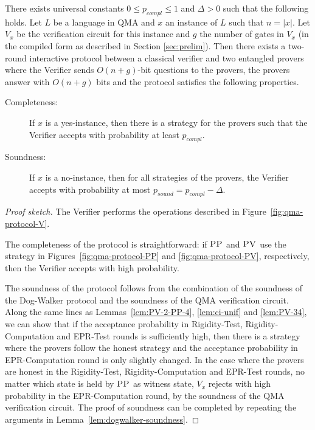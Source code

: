 \begin{lemma}
There
  exists universal constants $0\leq p_{compl}\leq 1$ and $\Delta >0$ such that the following holds. 
Let $L$ be a language in QMA and $x$ an instance of $L$ such that $n = |x|$. Let  $V_x$ be the
  verification circuit for this instance and $g$ the number of gates in $V_x$
  (in the compiled form as described in Section \ref{sec:prelim}). Then there exists a two-round interactive protocol
between a classical verifier and two entangled provers where the Verifier
sends  $O(n + g)$-bit questions to the provers, the provers answer with $O(n + g)$ bits and the protocol satisfies the following properties.
\begin{description}
\item[Completeness:] If $x$ is a yes-instance, then  there is a strategy for the provers such that the Verifier accepts with probability  at least $p_{compl}$.
\item[Soundness:] If $x$ is a no-instance, then for all strategies of the provers, the Verifier accepts with  probability at most
$p_{sound} = p_{compl} - \Delta$.
\end{description}
\end{lemma}
\begin{proof}[Proof sketch]
The Verifier performs the operations described in Figure~\ref{fig:qma-protocol-V}. 

  The completeness of the protocol is straightforward: if $\textsc{PP}$ and $\textsc{PV}$ use the strategy in Figures~\ref{fig:qma-protocol-PP} and \ref{fig:qma-protocol-PV}, respectively, then the Verifier accepts with  high probability.

  The soundness of the protocol follows from the combination of the soundness of the
  Dog-Walker protocol and the soundness of the QMA verification circuit. Along the same lines as 
  Lemmas~\ref{lem:PV-2-PP-4}, \ref{lem:ci-unif} and \ref{lem:PV-34},
  we can show that if
  the acceptance probability in Rigidity-Test, Rigidity-Computation and
  EPR-Test rounds
  is sufficiently high, then there is a strategy where the provers follow the honest
  strategy and the acceptance probability in EPR-Computation round is only slightly
  changed.  
  In the case where the provers are honest in the Rigidity-Test, Rigidity-Computation and EPR-Test rounds, no matter which state is held
  by $\textsc{PP}$ as witness state, $V_x$ rejects with high probability in the EPR-Computation round, by the
  soundness of the QMA verification circuit.  The proof of soundness can be completed by repeating the
  arguments in Lemma~\ref{lem:dogwalker-soundness}.
\end{proof}

